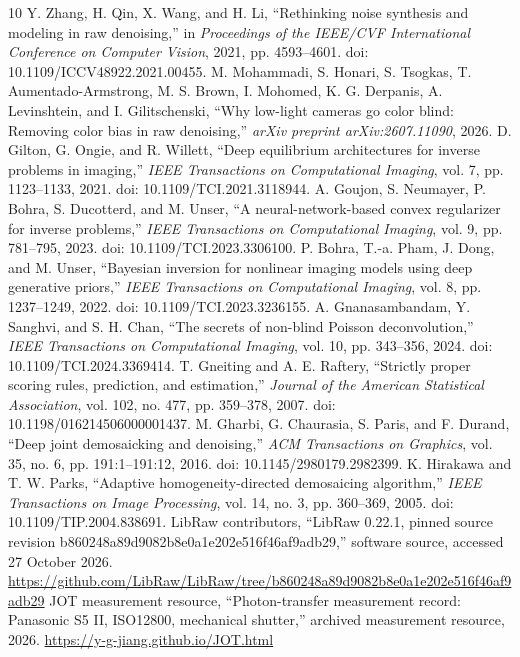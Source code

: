 \documentclass[10pt,twocolumn,journal]{IEEEtran}
\begin{document}
\begin{thebibliography}{10}
 Y. Zhang, H. Qin, X. Wang, and H. Li, ``Rethinking noise synthesis and modeling in raw denoising,'' in \emph{Proceedings of the IEEE/CVF International Conference on Computer Vision}, 2021, pp. 4593--4601. doi: 10.1109/ICCV48922.2021.00455.
 M. Mohammadi, S. Honari, S. Tsogkas, T. Aumentado-Armstrong, M. S. Brown, I. Mohomed, K. G. Derpanis, A. Levinshtein, and I. Gilitschenski, ``Why low-light cameras go color blind: Removing color bias in raw denoising,'' \emph{arXiv preprint arXiv:2607.11090}, 2026.
 D. Gilton, G. Ongie, and R. Willett, ``Deep equilibrium architectures for inverse problems in imaging,'' \emph{IEEE Transactions on Computational Imaging}, vol. 7, pp. 1123--1133, 2021. doi: 10.1109/TCI.2021.3118944.
 A. Goujon, S. Neumayer, P. Bohra, S. Ducotterd, and M. Unser, ``A neural-network-based convex regularizer for inverse problems,'' \emph{IEEE Transactions on Computational Imaging}, vol. 9, pp. 781--795, 2023. doi: 10.1109/TCI.2023.3306100.
 P. Bohra, T.-a. Pham, J. Dong, and M. Unser, ``Bayesian inversion for nonlinear imaging models using deep generative priors,'' \emph{IEEE Transactions on Computational Imaging}, vol. 8, pp. 1237--1249, 2022. doi: 10.1109/TCI.2023.3236155.
 A. Gnanasambandam, Y. Sanghvi, and S. H. Chan, ``The secrets of non-blind Poisson deconvolution,'' \emph{IEEE Transactions on Computational Imaging}, vol. 10, pp. 343--356, 2024. doi: 10.1109/TCI.2024.3369414.
 T. Gneiting and A. E. Raftery, ``Strictly proper scoring rules, prediction, and estimation,'' \emph{Journal of the American Statistical Association}, vol. 102, no. 477, pp. 359--378, 2007. doi: 10.1198/016214506000001437.
 M. Gharbi, G. Chaurasia, S. Paris, and F. Durand, ``Deep joint demosaicking and denoising,'' \emph{ACM Transactions on Graphics}, vol. 35, no. 6, pp. 191:1--191:12, 2016. doi: 10.1145/2980179.2982399.
 K. Hirakawa and T. W. Parks, ``Adaptive homogeneity-directed demosaicing algorithm,'' \emph{IEEE Transactions on Image Processing}, vol. 14, no. 3, pp. 360--369, 2005. doi: 10.1109/TIP.2004.838691.
 LibRaw contributors, ``LibRaw 0.22.1, pinned source revision b860248a89d9082b8e0a1e202e516f46af9adb29,'' software source, accessed 27 October 2026. \url{https://github.com/LibRaw/LibRaw/tree/b860248a89d9082b8e0a1e202e516f46af9adb29}
 JOT measurement resource, ``Photon-transfer measurement record: Panasonic S5 II, ISO12800, mechanical shutter,'' archived measurement resource, 2026. \url{https://y-g-jiang.github.io/JOT.html}

\end{thebibliography}
\end{document}
